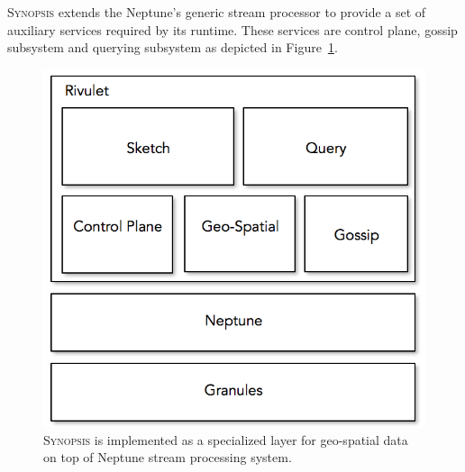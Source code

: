 \textsc{Synopsis} extends the Neptune's generic stream processor to provide a set of auxiliary services required by its runtime.
These services are control plane, gossip subsystem and querying subsystem as depicted in Figure~\ref{fig:rivulet-archi}.
%
\begin{figure}
    \centerline{\includegraphics[scale=0.5]{figures/rivulet-archi.png}}
    \caption{\textsc{Synopsis} is implemented as a specialized layer for geo-spatial data on top of Neptune stream processing system.}
    \label{fig:rivulet-archi}
\end{figure}
%
